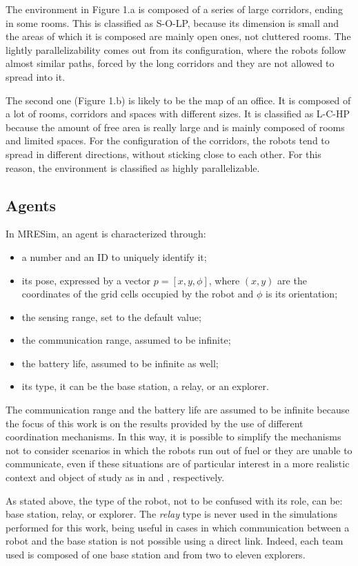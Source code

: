 The environment in Figure 1.a is composed of a series of large corridors,
ending in some rooms. This is classified as S-O-LP, because its dimension
is small and the areas of which it is composed are mainly open ones,
not cluttered rooms. The lightly parallelizability comes out from
its configuration, where the robots follow almost similar paths, forced
by the long corridors and they are not allowed to spread into it. 

The second one (Figure 1.b) is likely to be the map of an office.
It is composed of a lot of rooms, corridors and spaces with different
sizes. It is classified as L-C-HP because the amount of free area
is really large and is mainly composed of rooms and limited spaces.
For the configuration of the corridors, the robots tend to spread
in different directions, without sticking close to each other. For
this reason, the environment is classified as highly parallelizable.

\subsection{Agents}

In MRESim, an agent is characterized through:
\begin{itemize}
\item a number and an ID to uniquely identify it;
\item its pose, expressed by a vector $p=\left[x,y,\phi\right]$, where
$\left(x,y\right)$ are the coordinates of the grid cells occupied
by the robot and $\phi$ is its orientation;
\item the sensing range, set to the default value;
\item the communication range, assumed to be infinite;
\item the battery life, assumed to be infinite as well;
\item its type, it can be the base station, a relay, or an explorer.
\end{itemize}
The communication range and the battery life are assumed to be infinite
because the focus of this work is on the results provided by the use
of different coordination mechanisms. In this way, it is possible
to simplify the mechanisms not to consider scenarios in which the
robots run out of fuel or they are unable to communicate, even if
these situations are of particular interest in a more realistic context
and object of study as in \cite{Awerbuch1999} and \cite{Burgard2005}, respectively. 

As stated above, the type of the robot, not to be confused with its
role, can be: base station, relay, or explorer. The \emph{relay} type
is never used in the simulations performed for this work, being useful
in cases in which communication between a robot and the base station
is not possible using a direct link. Indeed, each team used is composed
of one base station and from two to eleven explorers. 

